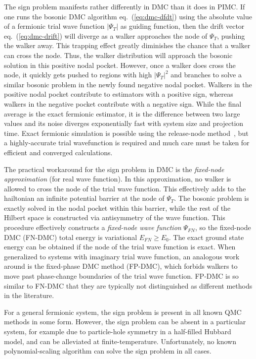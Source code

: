 The sign problem manifests rather differently in DMC than it does in PIMC.
If one runs the bosonic DMC algorithm eq.~(\ref{eq:dmc-dfdt}) using the absolute value of a fermionic trial wave function $\vert\Psi_T\vert$ as guiding function, then the drift vector eq.~(\ref{eq:dmc-drift}) will diverge as a walker approaches the node of $\Psi_T$, pushing the walker away.
This trapping effect greatly diminishes the chance that a walker can cross the node.
Thus, the walker distribution will approach the bosonic solution in this positive nodal pocket.
However, once a walker does cross the node, it quickly gets pushed to regions with high $\vert\Psi_T\vert^2$ and branches to solve a similar bosonic problem in the newly found negative nodal pocket.
Walkers in the positive nodal pocket contribute to estimators with a positive sign, whereas walkers in the negative pocket contribute with a negative sign.
While the final average is the exact fermionic estimator, it is the difference between two large values and its noise diverges exponentially fast with system size and projection time.
Exact fermionic simulation is possible using the release-node method~\cite{Ceperley1978}, but a highly-accurate trial wavefunction is required and much care must be taken for efficient and converged calculations.

The practical workaround for the sign problem in DMC is the \textit{fixed-node approximation} (for real wave function).
In this approximation, no walker is allowed to cross the node of the trial wave function.
This effectively adds to the hailtonian an infinite potential barrier at the node of $\Psi_T$.
The bosonic problem is exactly solved in the nodal pocket within this barrier, while the rest of the Hilbert space is constructed via antisymmetry of the wave function.
This procedure effectively constructs a \emph{fixed-node wave function} $\Psi_{FN}$, so the fixed-node DMC (FN-DMC) total energy is variational $E_{FN}\ge E_0$.
The exact ground state energy can be obtained if the node of the trial wave function is exact.
When generalized to systems with imaginary trial wave function, an analogous work around is the fixed-phase DMC method (FP-DMC), which forbids walkers to move past phase-change boundaries of the trial wave function.
FP-DMC is so similar to FN-DMC that they are typically not distinguished as different methods in the literature.

For a general fermionic system, the sign problem is present in all known QMC methods in some form.
However, the sign problem can be absent in a particular system, for example due to particle-hole symmetry in a half-filled Hubbard model, and can be alleviated at finite-temperature.
Unfortunately, no known polynomial-scaling algorithm can solve the sign problem in all cases.
